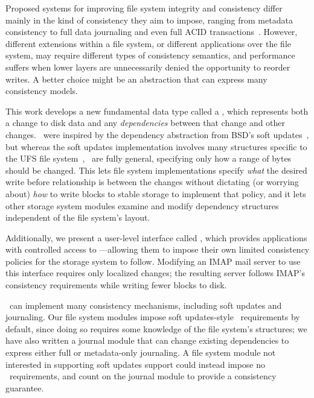 Proposed systems for improving file system integrity and consistency differ
 mainly in the kind of consistency they aim to impose, ranging from
 metadata consistency to full data journaling
 and even full ACID
 transactions~\cite{gal05transactional,liskov04transactional}.
%
However, different extensions within a file system, or different
 applications over the file system, may require different types of
 consistency semantics, and performance suffers when lower layers are
 unnecessarily denied the opportunity to reorder writes.
%
A better choice might be an abstraction that can express many consistency
 models.
%


This work develops a new fundamental data type called a \emph{\patch},
 which represents both a change to disk data and any \emph{dependencies}
 between that change and other changes. 
%
\Patches\ were inspired by the dependency abstraction from BSD's soft
 updates~\cite{ganger00soft}, but whereas the soft updates implementation
 involves many structures specific to the UFS file
 system~\cite{mckusick99soft}, \patches\ are fully general,
 specifying only how a range of bytes should be changed.
%
This lets file system implementations specify \emph{what} the desired
 write before relationship is between the changes without dictating (or
 worrying about) \emph{how} to write blocks to stable storage to implement
 that policy, and it lets other storage system modules examine and
 modify dependency structures independent of the file system's layout.


Additionally, we present a user-level interface called \patchgroups,
 which provides applications with controlled access to \patches---allowing
 them to impose their own limited consistency policies for the storage
 system to follow.
%
Modifying an IMAP mail server to use this interface requires only localized
 changes; the resulting server follows IMAP's consistency requirements
 while writing fewer blocks to disk. 


\Patches\ can implement many consistency mechanisms, including
 soft updates and journaling.
%
Our file system modules impose soft updates-style \patch\ requirements by
 default, since doing so requires some knowledge of the file system's
 structures; we have also written a journal module that can change
 existing dependencies to express either full or metadata-only journaling.
%
A file system module not interested in supporting soft updates support
 could instead impose no \patch\ requirements, and count on the journal
 module to provide a consistency guarantee.


